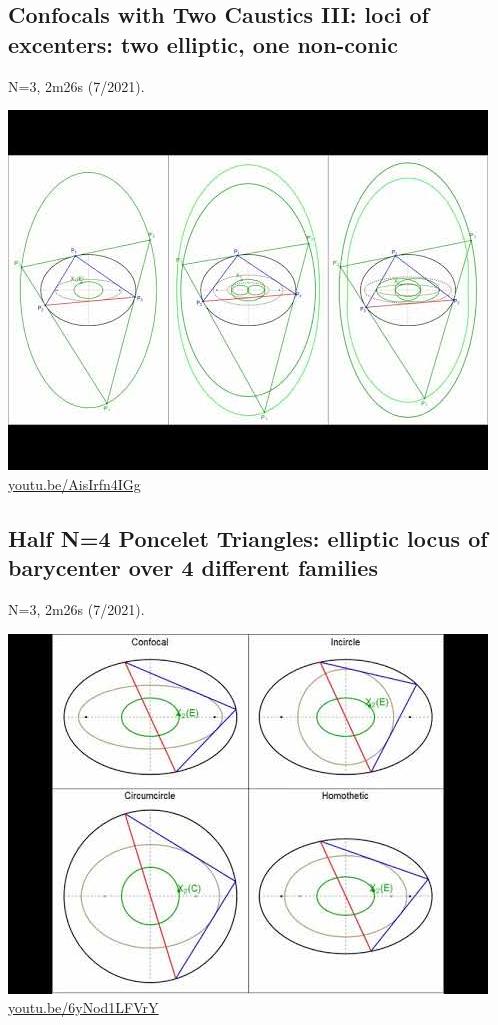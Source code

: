\documentclass[12pt]{amsart}
\begin{document}
\subsection{Confocals with Two Caustics III: loci of excenters: two elliptic, one non-conic}
\label{vid:AisIrfn4IGg}
\noindent N=3, 2m26s (7/2021). 
\begin{center}\includegraphics[width=.5\textwidth]{pics/AisIrfn4IGg.jpg} \\ 
\href{https://youtu.be/AisIrfn4IGg}{\url{youtu.be/AisIrfn4IGg}}\end{center}
% 

\subsection{Half N=4 Poncelet Triangles: elliptic locus of barycenter over 4 different families}
\label{vid:6yNod1LFVrY}
\noindent N=3, 2m26s (7/2021). 
\begin{center}\includegraphics[width=.5\textwidth]{pics/6yNod1LFVrY.jpg} \\ 
\href{https://youtu.be/6yNod1LFVrY}{\url{youtu.be/6yNod1LFVrY}}\end{center}
% 
\end{document}
